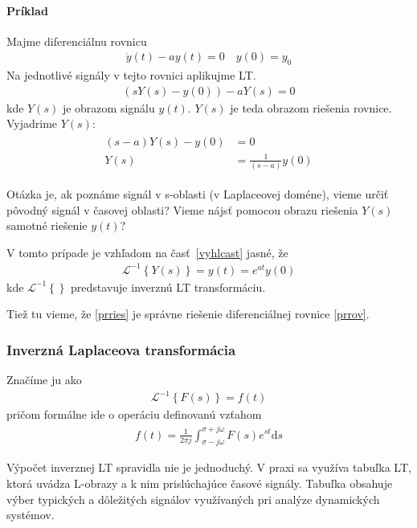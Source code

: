 \documentclass[a4paper, 10pt, ]{article}
\begin{document}
\paragraph{Príklad}

Majme diferenciálnu rovnicu
\begin{align}  \label{prrov}
    \dot y(t) - a y(t) = 0 \quad y(0) = y_0
\end{align}
Na jednotlivé signály v tejto rovnici aplikujme LT.
\begin{align}
    \left( s Y(s) - y(0)  \right) - a Y(s) = 0
\end{align}
kde $Y(s)$ je obrazom signálu $y(t)$. $Y(s)$ je teda obrazom riešenia rovnice. Vyjadrime $Y(s)$:
\begin{align}
    \begin{aligned}
        (s-a)Y(s) - y(0) &= 0 \\
        Y(s) &= \frac{1}{(s-a)} y(0)
    \end{aligned}
\end{align}

Otázka je, ak poznáme signál v s-oblasti (v Laplaceovej doméne), vieme určiť pôvodný signál v časovej oblasti? Vieme nájsť pomocou obrazu riešenia $Y(s)$ samotné riešenie $y(t)$?

V tomto prípade je vzhľadom na časť~\ref{vyhlcast} jasné, že
\begin{align} \label{prries}
    \mathcal L ^{-1} \left\{ Y(s) \right\} = y(t) = e^{at}y(0)
\end{align}
kde $\mathcal L ^{-1} \left\{  \right\}$ predstavuje  inverznú LT transformáciu.

Tiež tu vieme, že \eqref{prries} je správne riešenie diferenciálnej rovnice \eqref{prrov}.

\subsubsection{Inverzná Laplaceova transformácia}

Značíme ju ako
\begin{align}
    \mathcal L ^{-1} \left\{ F(s) \right\} = f(t)
\end{align}
pričom formálne ide o operáciu definovanú vzťahom
\begin{align}
    f(t) = \frac{1}{2\pi j} \int_{\sigma-j\omega}^{\sigma + j\omega} F(s) e^{st} \text{d}s
\end{align}

Výpočet inverznej LT spravidla nie je jednoduchý. V praxi sa využíva tabuľka LT, ktorá uvádza L-obrazy a k nim prislúchajúce časové signály. Tabuľka obsahuje výber typických a dôležitých signálov využívaných pri analýze dynamických systémov.
\end{document}
